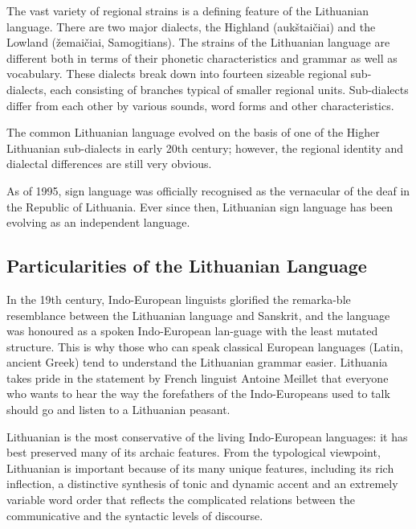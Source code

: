 \begin{multicols}{2}
    The vast variety of regional strains is a defining feature of the Lithuanian language. There are two major dialects, the Highland (aukštaičiai) and the Lowland (žemaičiai, Samogitians). The strains of the Lithuanian language are different both in terms of their phonetic characteristics and grammar as well as vocabulary. These dialects break down into fourteen sizeable regional sub-dialects, each consisting of branches typical of smaller regional units. Sub-dialects differ from each other by various sounds, word forms and other characteristics.

The common Lithuanian language evolved on the basis of one of the Higher Lithuanian sub-dialects in early 20th century; however, the regional identity and dialectal differences are still very obvious.

As of 1995, sign language was officially recognised as the vernacular of the deaf in the Republic of Lithuania. Ever since then, Lithuanian sign language has been evolving as an independent language.

\subsection{Particularities of the Lithuanian  Language}

In the 19th century, Indo-European linguists glorified the remarka-ble resemblance between the Lithuanian language and Sanskrit, and the language was honoured as a spoken Indo-European lan-guage with the least mutated structure. This is why those who can speak classical European languages (Latin, ancient Greek) tend to understand the Lithuanian grammar easier. Lithuania takes pride in the statement by French linguist Antoine Meillet that everyone who wants to hear the way the forefathers of the Indo-Europeans used to talk should go and listen to a Lithuanian peasant.

Lithuanian is the most conservative of the living Indo-European languages: it has best preserved many of its archaic features. From the typological viewpoint, Lithuanian is important because of its many unique features, including its rich inflection, a distinctive synthesis of tonic and dynamic accent and an extremely variable word order that reflects the complicated relations between the communicative and the syntactic levels of discourse.



\end{multicols}
